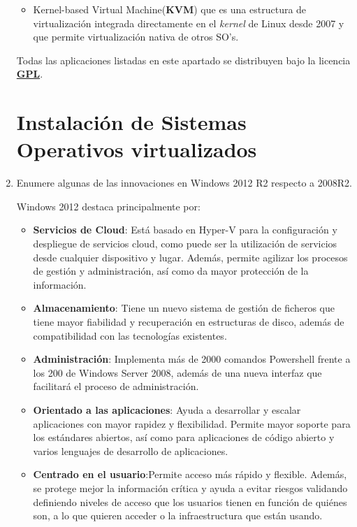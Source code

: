 \documentclass[paper=a4, fontsize=11pt]{scrartcl} %
\numberwithin{equation}{section} %
\numberwithin{figure}{section} %
\numberwithin{table}{section} %
\begin{document}
\begin{enumerate}
\begin{itemize}
			\item Kernel-based Virtual Machine(\textbf{KVM}\cite{KVM}) que es una estructura de 
			virtualización integrada directamente en el \textit{kernel} de Linux desde 2007 y que
			permite virtualización nativa de otros SO's.
		\end{itemize}
		
		Todas las aplicaciones listadas en este apartado se distribuyen bajo la licencia
		\href{https://www.gnu.org/licenses/gpl.html}{\textbf{GPL}}.
		
	\section{Instalación de Sistemas Operativos virtualizados}
		\item Enumere algunas de las innovaciones en Windows 2012 R2 respecto a 2008R2.
		
		Windows 2012 destaca principalmente por:
		\begin{itemize}
			\item \textbf{Servicios de Cloud}\cite{Hoja_Datos}\cite{Overview}\cite{TechWeek}:
			Está basado en Hyper-V para la configuración y despliegue de servicios cloud, como
			puede ser la utilización de servicios desde cualquier dispositivo y lugar. Además,
			permite agilizar los procesos de gestión y administración, así como da mayor
			protección de la información.
			
			\item \textbf{Almacenamiento}\cite{TechWeek}: Tiene un nuevo sistema de gestión de
			ficheros que tiene mayor fiabilidad y recuperación en estructuras de disco, además
			de compatibilidad con las tecnologías existentes.
			
			\item \textbf{Administración}\cite{TechWeek}: Implementa más de 2000 comandos
			Powershell frente a los 200 de Windows Server 2008, además de una nueva interfaz
			que facilitará el proceso de administración.
			
			\item \textbf{Orientado a las aplicaciones}\cite{Hoja_Datos}\cite{Overview}: Ayuda a
			desarrollar y escalar aplicaciones con mayor rapidez y flexibilidad. Permite mayor
			soporte para los estándares abiertos, así como para aplicaciones de código abierto y
			varios lenguajes de desarrollo de aplicaciones.
			
			\item \textbf{Centrado en el usuario}\cite{Hoja_Datos}\cite{Overview}:Permite acceso
			más rápido y flexible. Además, se protege mejor la información crítica y ayuda a
			evitar riesgos validando definiendo niveles de acceso que los usuarios tienen en
			función de quiénes son, a lo que quieren acceder o la infraestructura que están usando.
		\end{itemize}
		

\end{enumerate}
\end{document}
